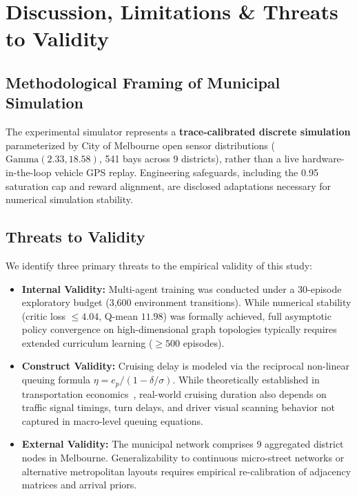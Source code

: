 \documentclass[journal]{IEEEtran}
\begin{document}
\section{Discussion, Limitations \& Threats to Validity}

\subsection{Methodological Framing of Municipal Simulation}
The experimental simulator represents a \textbf{trace-calibrated discrete simulation} parameterized by City of Melbourne open sensor distributions ($\text{Gamma}(2.33, 18.58)$, 541 bays across 9 districts), rather than a live hardware-in-the-loop vehicle GPS replay. Engineering safeguards, including the 0.95 saturation cap and reward alignment, are disclosed adaptations necessary for numerical simulation stability.

\subsection{Threats to Validity}
We identify three primary threats to the empirical validity of this study:
\begin{itemize}
    \item \textbf{Internal Validity:} Multi-agent training was conducted under a 30-episode exploratory budget (3,600 environment transitions). While numerical stability (critic loss $\le 4.04$, Q-mean $11.98$) was formally achieved, full asymptotic policy convergence on high-dimensional graph topologies typically requires extended curriculum learning ($\ge 500$ episodes).
    \item \textbf{Construct Validity:} Cruising delay is modeled via the reciprocal non-linear queuing formula $\eta = e_p / (1 - \delta / \sigma)$. While theoretically established in transportation economics~\cite{shoup2006cruising}, real-world cruising duration also depends on traffic signal timings, turn delays, and driver visual scanning behavior not captured in macro-level queuing equations.
    \item \textbf{External Validity:} The municipal network comprises 9 aggregated district nodes in Melbourne. Generalizability to continuous micro-street networks or alternative metropolitan layouts requires empirical re-calibration of adjacency matrices and arrival priors.
\end{itemize}
\end{document}
